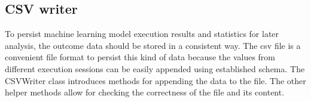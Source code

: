 \subsection{CSV writer}\label{subsec:csv-writer}
To persist machine learning model execution results and statistics for later analysis, the outcome data should be stored in a consistent way.
The \gls{csv} file is a convenient file format to persist this kind of data because the values from different execution sessions can be easily appended using established schema.
The CSVWriter class introduces methods for appending the data to the file.
The other helper methods allow for checking the correctness of the file and its content.
